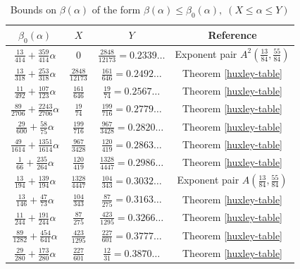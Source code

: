 \begin{table}[ht]
    \def\arraystretch{1.3}
    \centering
    \caption{Bounds on $\beta(\alpha)$ of the form $\beta(\alpha) \le \beta_0(\alpha), \;(X \le \alpha \le Y)$}
    \begin{tabular}{|c|c|c|c|}
    \hline
    $\beta_0(\alpha)$ & $X$ & $Y$ & Reference\\
    \hline
    $ \frac{13}{414} + \frac{359}{414} \alpha $ & $ 0 $ & $ \frac{2848}{12173} = 0.2339\ldots $ & Exponent pair $A^2(\frac{13}{84}, \frac{55}{84})$\\
    \hline
    $\frac{13}{318} + \frac{253}{318} \alpha$ & $\frac{2848}{12173}$ & $\frac{161}{646} = 0.2492\ldots$ & Theorem \ref{huxley-table}\\
    \hline
    $\frac{11}{492} + \frac{107}{123} \alpha$ & $\frac{161}{646}$ & $\frac{19}{74} = 0.2567\ldots$ & Theorem \ref{huxley-table}\\
    \hline
    $ \frac{89}{2706} + \frac{2243}{2706} \alpha $ & $ \frac{19}{74} $ & $ \frac{199}{716} = 0.2779\ldots $ & Theorem \ref{huxley-table}\\
    \hline
    $ \frac{29}{600} + \frac{58}{75} \alpha $ & $ \frac{199}{716} $ & $ \frac{967}{3428} = 0.2820\ldots $ & Theorem \ref{huxley-table}\\
    \hline
    $ \frac{49}{1614} + \frac{1351}{1614} \alpha $ & $ \frac{967}{3428} $ & $ \frac{120}{419} = 0.2863\ldots $ & Theorem \ref{huxley-table}\\
    \hline
    $ \frac{1}{66} + \frac{235}{264} \alpha $ & $ \frac{120}{419} $ & $ \frac{1328}{4447} = 0.2986\ldots $ & Theorem \ref{huxley-table}\\
    \hline
    $ \frac{13}{194} + \frac{139}{194} \alpha $ & $ \frac{1328}{4447} $ & $ \frac{104}{343} = 0.3032\ldots $ & Exponent pair $A(\frac{13}{84}, \frac{55}{84})$\\
    \hline
    $ \frac{13}{146} + \frac{47}{73} \alpha $ & $ \frac{104}{343} $ & $ \frac{87}{275} = 0.3163\ldots $ & Theorem \ref{huxley-table}\\
    \hline
    $ \frac{11}{244} + \frac{191}{244} \alpha $ & $ \frac{87}{275} $ & $ \frac{423}{1295} = 0.3266\ldots $ & Theorem \ref{huxley-table}\\
    \hline
    $ \frac{89}{1282} + \frac{454}{641} \alpha $ & $ \frac{423}{1295} $ & $ \frac{227}{601} = 0.3777\ldots $ & Theorem \ref{huxley-table}\\
    \hline
    $ \frac{29}{280} + \frac{173}{280} \alpha $ & $ \frac{227}{601} $ & $ \frac{12}{31} = 0.3870\ldots $ & Theorem \ref{huxley-table}\\

\end{tabular}
\end{table}
